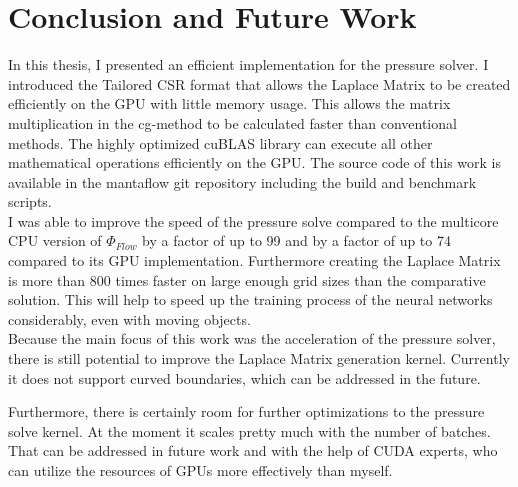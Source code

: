 \chapter{Conclusion and Future Work}\label{chapter:conclusion}

In this thesis, I presented an efficient implementation for the pressure solver. I introduced the Tailored CSR format that allows the Laplace Matrix to be created efficiently on the GPU with little memory usage. This allows the matrix multiplication in the cg-method to be calculated faster than conventional methods. The highly optimized cuBLAS library can execute all other mathematical operations efficiently on the GPU. The source code of this work is available in the mantaflow git repository including the build and benchmark scripts.\\

I was able to improve the speed of the pressure solve compared to the multicore CPU version of $\Phi_{Flow}$ by a factor of up to 99 and by a factor of up to 74 compared to its GPU implementation. Furthermore creating the Laplace Matrix is more than 800 times faster on large enough grid sizes than the comparative solution. This will help to speed up the training process of the neural networks considerably, even with moving objects. \\

Because the main focus of this work was the acceleration of the pressure solver, there is still potential to improve the Laplace Matrix generation kernel. Currently it does not support curved boundaries, which can be addressed in the future.
\par Furthermore, there is certainly room for further optimizations to the pressure solve kernel. At the moment it scales pretty much with the number of batches. That can be addressed in future work and with the help of CUDA experts, who can utilize the resources of GPUs more effectively than myself. 